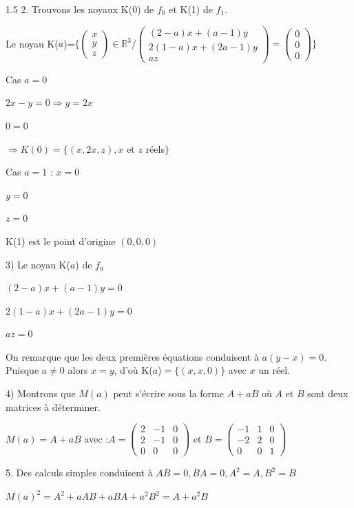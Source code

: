 \documentclass[12pt]{article}
\begin{document}
\begin{spacing}{1.5}
2. Trouvons les noyaux K(0) de $f_0$ et K(1) de $f_1$.

Le noyau K($a$)=$\{\begin{pmatrix}
x\\
y\\
z
\end{pmatrix}\in \mathbb{R}^3/\begin{pmatrix}
(2-a)x+(a-1)y\\
2(1-a)x+(2a-1)y\\
az
\end{pmatrix}=\begin{pmatrix}
0\\
0\\
0
\end{pmatrix}\}$

Cas $a = 0$

$2x-y = 0\Longrightarrow y=2x$

$0 = 0$

$\Longrightarrow K(0) = \{(x, 2x, z), x$ et $z$ réels$\}$


\medskip Cas $a = 1$ :
$x = 0$

$y = 0$

$z = 0$

K(1) est le point d'origine $(0, 0, 0)$

3) Le noyau K($a$) de $f_a$

$(2-a)x + (a-1)y = 0$


$2(1-a)x + (2a-1)y = 0$

$az = 0$

On remarque que les deux premières équations conduisent à $a(y-x) = 0$. Puisque $a\neq 0$ alors $x=y$, d'où K($a$)$ = 
\{(x, x, 0)\}$ avec $x$ un réel.

4) Montrons que $M(a)$ peut s'écrire sous la forme $A + aB$ où $ A $ et $B$ sont deux matrices à déterminer.

$M(a) = A + aB$ avec :$A=\begin{pmatrix}
2 & -1 & 0 \\ 
2 & -1 & 0 \\ 
0 & 0 & 0
\end{pmatrix}$ et $B= \begin{pmatrix}
-1 & 1 & 0 \\ 
-2 & 2 & 0 \\ 
0 & 0 & 1
\end{pmatrix}$

5. Des calculs simples conduisent à $AB = 0, BA = 0, A^2= A, B^2= B$

$M(a)^2= A^2 + aAB + aBA + a^2B^2 = A + a^2B$


\end{spacing}
\end{document}

